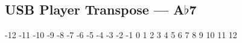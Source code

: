 \subsection[USB Player Transpose]{USB Player Transpose --- \UiKey{\SET}A$\flat$7}





























-12
-11
-10
-9
-8
-7
-6
-5
-4
-3
-2
-1
0
1
2
3
4
5
6
7
8
9
10
11
12
